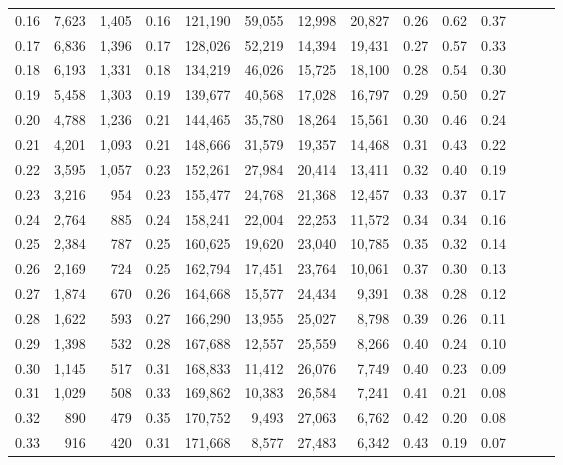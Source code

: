 \begin{tabular}{rrrrrrrrrrrrrr}
0.16 &   7,623 &  1,405 &  0.16 &  121,190 &   59,055 &  12,998 &  20,827 &  0.26 &  0.62 &      0.37 \\
0.17 &   6,836 &  1,396 &  0.17 &  128,026 &   52,219 &  14,394 &  19,431 &  0.27 &  0.57 &      0.33 \\
0.18 &   6,193 &  1,331 &  0.18 &  134,219 &   46,026 &  15,725 &  18,100 &  0.28 &  0.54 &      0.30 \\
0.19 &   5,458 &  1,303 &  0.19 &  139,677 &   40,568 &  17,028 &  16,797 &  0.29 &  0.50 &      0.27 \\
0.20 &   4,788 &  1,236 &  0.21 &  144,465 &   35,780 &  18,264 &  15,561 &  0.30 &  0.46 &      0.24 \\
0.21 &   4,201 &  1,093 &  0.21 &  148,666 &   31,579 &  19,357 &  14,468 &  0.31 &  0.43 &      0.22 \\
0.22 &   3,595 &  1,057 &  0.23 &  152,261 &   27,984 &  20,414 &  13,411 &  0.32 &  0.40 &      0.19 \\
0.23 &   3,216 &    954 &  0.23 &  155,477 &   24,768 &  21,368 &  12,457 &  0.33 &  0.37 &      0.17 \\
0.24 &   2,764 &    885 &  0.24 &  158,241 &   22,004 &  22,253 &  11,572 &  0.34 &  0.34 &      0.16 \\
0.25 &   2,384 &    787 &  0.25 &  160,625 &   19,620 &  23,040 &  10,785 &  0.35 &  0.32 &      0.14 \\
0.26 &   2,169 &    724 &  0.25 &  162,794 &   17,451 &  23,764 &  10,061 &  0.37 &  0.30 &      0.13 \\
0.27 &   1,874 &    670 &  0.26 &  164,668 &   15,577 &  24,434 &   9,391 &  0.38 &  0.28 &      0.12 \\
0.28 &   1,622 &    593 &  0.27 &  166,290 &   13,955 &  25,027 &   8,798 &  0.39 &  0.26 &      0.11 \\
0.29 &   1,398 &    532 &  0.28 &  167,688 &   12,557 &  25,559 &   8,266 &  0.40 &  0.24 &      0.10 \\
0.30 &   1,145 &    517 &  0.31 &  168,833 &   11,412 &  26,076 &   7,749 &  0.40 &  0.23 &      0.09 \\
0.31 &   1,029 &    508 &  0.33 &  169,862 &   10,383 &  26,584 &   7,241 &  0.41 &  0.21 &      0.08 \\
0.32 &     890 &    479 &  0.35 &  170,752 &    9,493 &  27,063 &   6,762 &  0.42 &  0.20 &      0.08 \\
0.33 &     916 &    420 &  0.31 &  171,668 &    8,577 &  27,483 &   6,342 &  0.43 &  0.19 &      0.07 \\

\end{tabular}
